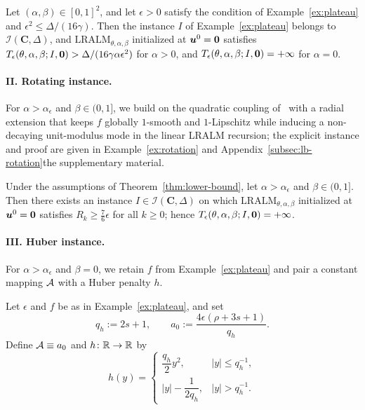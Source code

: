 \begin{lemma}
\label{lem:main-plateau}
Let \((\alpha,\beta)\in[0,1]^2\), and let \(\epsilon>0\) satisfy the
condition of Example~\ref{ex:plateau} and \(\epsilon^2\le\Delta/(16\gamma)\).
Then the instance \(I\) of Example~\ref{ex:plateau} belongs to
\(\mathcal I(\mathbf C,\Delta)\), and \(\mathrm{LRALM}_{\theta,\alpha,\beta}\)
initialized at \(\bm{u}^0=\bm{0}\) satisfies
\(T_\epsilon(\theta,\alpha,\beta;I,\bm{0})>\Delta/(16\gamma\alpha\epsilon^2)\)
for \(\alpha>0\), and \(T_\epsilon(\theta,\alpha,\beta;I,\bm{0})=+\infty\) for
\(\alpha=0\).
\end{lemma}

\paragraph{II. Rotating instance.}
For \(\alpha>\alpha_\epsilon\) and \(\beta\in(0,1]\), we build on the
quadratic coupling of~\cite[Example~5.1]{li2026smoothing} with a radial
extension that keeps \(f\) globally \(1\)-smooth and \(1\)-Lipschitz while
inducing a non-decaying unit-modulus mode in the linear LRALM recursion; the
explicit instance and proof are given in \ifsupp Example~\ref{ex:rotation} and
Appendix~\ref{subsec:lb-rotation}\else the supplementary material\fi.

\begin{lemma}
\label{lem:main-rotation}
Under the assumptions of Theorem~\ref{thm:lower-bound}, let
\(\alpha>\alpha_\epsilon\) and \(\beta\in(0,1]\). Then there exists an
instance \(I\in\mathcal I(\mathbf C,\Delta)\) on which
\(\mathrm{LRALM}_{\theta,\alpha,\beta}\) initialized at \(\bm{u}^0=\bm{0}\)
satisfies \(R_k\ge\frac76\epsilon\) for all \(k\ge0\); hence
\(T_\epsilon(\theta,\alpha,\beta;I,\bm{0})=+\infty\).
\end{lemma}

\paragraph{III. Huber instance.}
For \(\alpha>\alpha_\epsilon\) and \(\beta=0\), we retain \(f\) from
Example~\ref{ex:plateau} and pair a constant mapping \(\mathcal{A}\) with a Huber
penalty \(h\).

\begin{example}
\label{ex:huber}
Let \(\epsilon\) and \(f\) be as in Example~\ref{ex:plateau}, and set
\[
q_h:=2s+1,
\qquad
a_0:=\frac{4\epsilon(\rho+3s+1)}{q_h}.
\]
Define \(\mathcal{A}\equiv a_0\) and \(h\colon\mathbb{R}\to\mathbb{R}\) by
\[
h(y)=
\begin{cases}
\dfrac{q_h}{2}y^2, & |y|\le q_h^{-1},\\[4pt]
|y|-\dfrac{1}{2q_h}, & |y|>q_h^{-1}.
\end{cases}
\]
\end{example}

